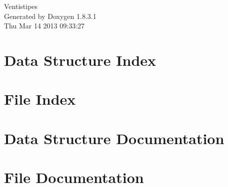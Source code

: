\documentclass{book}
\begin{document}
\hypersetup{pageanchor=false,citecolor=blue}
\begin{titlepage}
\vspace*{7cm}
\begin{center}
{\Large Ventistipes }\\
\vspace*{1cm}
{\large Generated by Doxygen 1.8.3.1}\\
\vspace*{0.5cm}
{\small Thu Mar 14 2013 09:33:27}\\
\end{center}
\end{titlepage}
\clearemptydoublepage
{}
\tableofcontents
\clearemptydoublepage
{}
\hypersetup{pageanchor=true,citecolor=blue}
\chapter{Data Structure Index}

\chapter{File Index}

\chapter{Data Structure Documentation}




\chapter{File Documentation}


















\printindex
\end{document}
